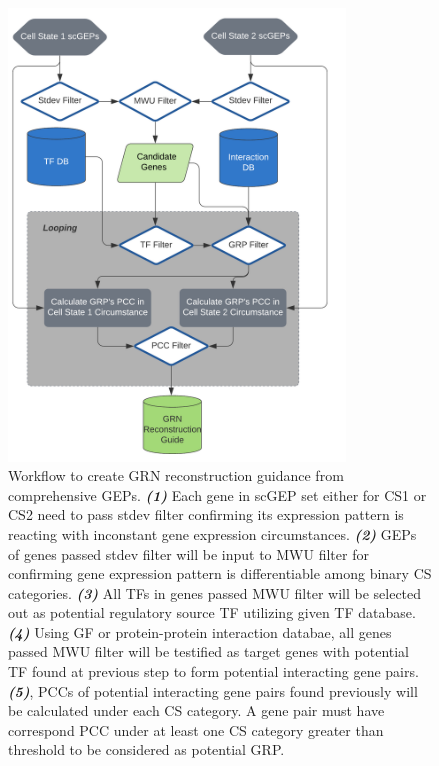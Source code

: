 \documentclass[fleqn,10pt]{wlscirep}
\begin{document}
\begin{figure}[ht]
\centering
\includegraphics[width=0.8\linewidth, height=12cm, keepaspectratio,]{image/Kirke.png}
\caption{
Workflow to create GRN reconstruction guidance from comprehensive GEPs.
\textbf{\emph{(1)}} Each gene in scGEP set either for CS1 or CS2 need to pass stdev filter confirming its expression pattern is reacting with inconstant gene expression circumstances.
\textbf{\emph{(2)}} GEPs of genes passed stdev filter will be input to MWU filter for confirming gene expression pattern is differentiable among binary CS categories.
\textbf{\emph{(3)}} All TFs in genes passed MWU filter will be selected out as potential regulatory source TF utilizing given TF database.
\textbf{\emph{(4)}} Using GF or protein-protein interaction databae, all genes passed MWU filter will be testified as target genes with potential TF found at previous step to form potential interacting gene pairs.
\textbf{\emph{(5)}}, PCCs of potential interacting gene pairs found previously will be calculated under each CS category. A gene pair must have correspond PCC under at least one CS category greater than threshold to be considered as potential GRP.
}
\label{kirke}
\end{figure}
\end{document}
